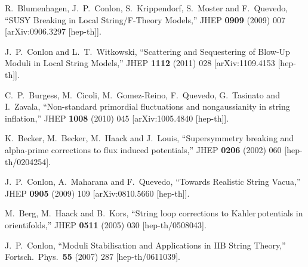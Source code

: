 \documentclass[11pt,a4paper]{article}
\newcommand{\Kahler}{\ensuremath{\text{K}\ddot{\text{a}}\text{hler}\,}}
\begin{document}
\begin{thebibliography}{99}
  R.~Blumenhagen, J.~P.~Conlon, S.~Krippendorf, S.~Moster and F.~Quevedo,
  ``SUSY Breaking in Local String/F-Theory Models,''
  JHEP {\bf 0909} (2009) 007
  [arXiv:0906.3297 [hep-th]].


  J.~P.~Conlon and L.~T.~Witkowski,
  ``Scattering and Sequestering of Blow-Up Moduli in Local String Models,''
  JHEP {\bf 1112} (2011) 028
  [arXiv:1109.4153 [hep-th]].


  C.~P.~Burgess, M.~Cicoli, M.~Gomez-Reino, F.~Quevedo, G.~Tasinato and I.~Zavala,
  ``Non-standard primordial fluctuations and nongaussianity in string inflation,''
  JHEP {\bf 1008} (2010) 045
  [arXiv:1005.4840 [hep-th]].


  K.~Becker, M.~Becker, M.~Haack and J.~Louis,
  ``Supersymmetry breaking and alpha-prime corrections to flux induced potentials,''
  JHEP {\bf 0206} (2002) 060
  [hep-th/0204254].


  J.~P.~Conlon, A.~Maharana and F.~Quevedo,
  ``Towards Realistic String Vacua,''
  JHEP {\bf 0905} (2009) 109
  [arXiv:0810.5660 [hep-th]].


  M.~Berg, M.~Haack and B.~Kors,
  ``String loop corrections to \Kahler potentials in orientifolds,''
  JHEP {\bf 0511} (2005) 030
  [hep-th/0508043].


  J.~P.~Conlon,
  ``Moduli Stabilisation and Applications in IIB String Theory,''
  Fortsch.\ Phys.\  {\bf 55} (2007) 287
  [hep-th/0611039].



\end{thebibliography}
\end{document}
